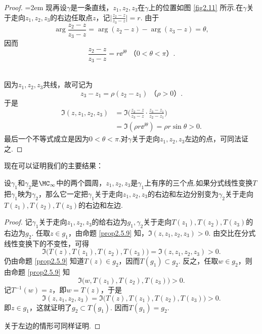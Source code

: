 \begin{proof}
\noindent\begin{minipage}[b]{0.3\textwidth}
\centering
{}
\end{minipage}
\begin{minipage}[b]{0.7\textwidth}\parindent=2em
现再设$\gamma$是一条直线，$z_1,z_2,z_3$在$\gamma$上的位置如图 \ref{fig2.11} 所示.在$\gamma$关于走向$z_1,z_2,z_3$的右边任取点$z$，记$\bigg|\frac{z_2-z}{z_3-z}\bigg|=r$. 由于
\[\arg\frac{z_2-z}{z_3-z}=\arg(z_2-z)-\arg(z_3-z)=\theta,\]
因而
\[\frac{z_2-z}{z_3-z}=r\ee^{\ii\theta}\,\,\mbox{（$0<\theta<\pi$）}.\]
\end{minipage}\\
因为$z_1,z_2,z_3$共线，故可记为
\[z_3-z_1=\rho(z_2-z_1)\;\mbox{（$\rho>0$）}.\]
于是
\begin{align*}
\Im(z,z_1,z_2,z_3)&=\Im\bigg(\frac{z_2-z}{z_3-z}\cdot\frac{z_3-z_1}{z_2-z_1}\bigg)\\
&=\Im(\rho r\ee^{\ii\theta})=\rho r\sin\theta>0.
\end{align*}
最后一个不等式成立是因为$0<\theta<\pi$.对$\gamma$关于走向$z_1,z_2,z_3$左边的点，可同法证之.
\end{proof}


现在可以证明我们的主要结果：
\begin{theorem}\label{thm2.5.10}
设$\gamma_1$和$\gamma_2$是$\MC_\infty$中的两个圆周，$z_1,z_2,z_3$是$\gamma_1$上有序的三个点.如果分式线性变换$T$把$\gamma_1$映为$\gamma_2$，那么它一定把$\gamma_1$关于走向$z_1,z_2,z_3$的右边和左边分别变为$\gamma_2$关于走向$T(z_1),T(z_2),T(z_3)$的右边和左边.
\end{theorem}
\begin{proof}
记$\gamma_1$关于走向$z_1,z_2,z_3$的给右边为$g_1,\gamma_2$关于走向$T(z_1),T(z_2),T(z_3)$的右边为$g_2$. 任取$z\in g_1$，由命题 \ref{prop2.5.9} 知，$\Im(z,z_1,z_2,z_3)>0$. 由交比在分式线性变换下的不变性，可得
\[\Im\big(T(z),T(z_1),T(z_2),T(z_3)\big)=\Im(z,z_1,z_2,z_3)>0.\]
仍由命题 \ref{prop2.5.9} 知道$T(z)\in g_2$，因而$T(g_1)\subset g_2$. 反之，任取$w\in g_2$，则由命题 \ref{prop2.5.9} 知
\[\Im\big(w,T(z_1),T(z_2),T(z_3)\big)>0.\]
记$T^{-1}(w)=z$，即$w=T(z)$，于是
\[\Im(z,z_1,z_2,z_3)=\Im\big(T(z),T(z_1),T(z_2),T(z_3)\big)>0.\]
即$z\in g_1$，这就证明了$g_2\subset T(g_1)$. 因而$T(g_1)=g_2$.

关于左边的情形可同样证明.
\end{proof}

